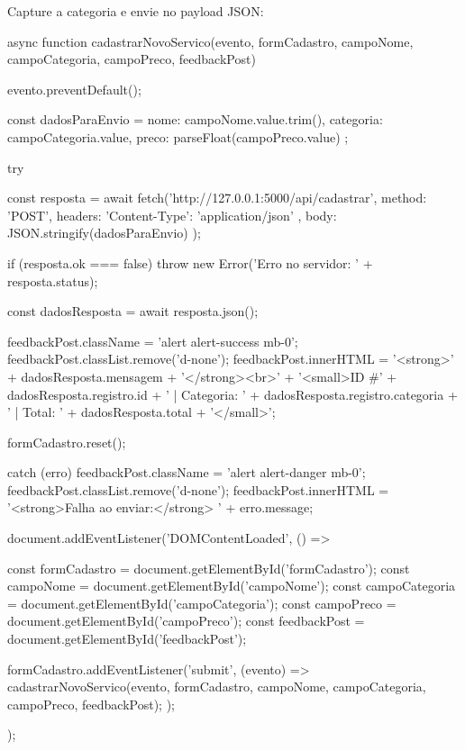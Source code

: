 Capture a categoria e envie no payload JSON:
\begin{boxCodigoJS}
async function cadastrarNovoServico(evento, formCadastro, campoNome, campoCategoria, campoPreco, feedbackPost) {
  evento.preventDefault();

  const dadosParaEnvio = {
    nome: campoNome.value.trim(),
    categoria: campoCategoria.value,
    preco: parseFloat(campoPreco.value)
  };

  try {
    const resposta = await fetch('http://127.0.0.1:5000/api/cadastrar', {
      method: 'POST',
      headers: {
        'Content-Type': 'application/json'
      },
      body: JSON.stringify(dadosParaEnvio)
    });

    if (resposta.ok === false) {
      throw new Error('Erro no servidor: ' + resposta.status);
    }

    const dadosResposta = await resposta.json();

    feedbackPost.className = 'alert alert-success mb-0';
    feedbackPost.classList.remove('d-none');
    feedbackPost.innerHTML =
      '<strong>' + dadosResposta.mensagem + '</strong><br>' +
      '<small>ID #' + dadosResposta.registro.id +
      ' | Categoria: ' + dadosResposta.registro.categoria +
      ' | Total: ' + dadosResposta.total + '</small>';

    formCadastro.reset();

  } catch (erro) {
    feedbackPost.className = 'alert alert-danger mb-0';
    feedbackPost.classList.remove('d-none');
    feedbackPost.innerHTML = '<strong>Falha ao enviar:</strong> ' + erro.message;
  }
}

document.addEventListener('DOMContentLoaded', () => {
  const formCadastro = document.getElementById('formCadastro');
  const campoNome = document.getElementById('campoNome');
  const campoCategoria = document.getElementById('campoCategoria');
  const campoPreco = document.getElementById('campoPreco');
  const feedbackPost = document.getElementById('feedbackPost');

  formCadastro.addEventListener('submit', (evento) => {
    cadastrarNovoServico(evento, formCadastro, campoNome, campoCategoria, campoPreco, feedbackPost);
  });
});
\end{boxCodigoJS}

